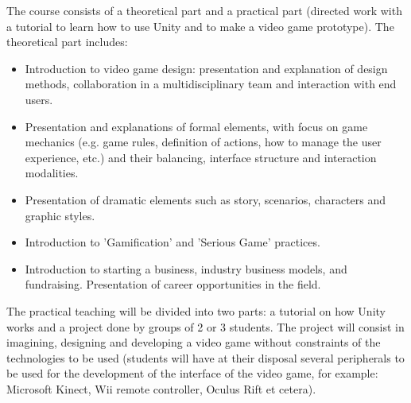 The course consists of a theoretical part and a practical part (directed work with a tutorial to learn how to use Unity and to make a video game prototype). The theoretical part includes:
\begin{itemize}
    \item Introduction to video game design: presentation and explanation of design methods, collaboration in a multidisciplinary team and interaction with end users.
    \item Presentation and explanations of formal elements, with focus on game mechanics (e.g. game rules, definition of actions, how to manage the user experience, etc.) and their balancing, interface structure and interaction modalities.
    \item Presentation of dramatic elements such as story, scenarios, characters and graphic styles.
    \item Introduction to 'Gamification' and 'Serious Game' practices.
    \item Introduction to starting a business, industry business models, and fundraising. Presentation of career opportunities in the field.
\end{itemize}
The practical teaching will be divided into two parts: a tutorial on how Unity works and a project done by groups of 2 or 3 students. The project will consist in imagining, designing and developing a video game without constraints of the technologies to be used (students will have at their disposal several peripherals to be used for the development of the interface of the video game, for example: Microsoft Kinect, Wii remote controller, Oculus Rift et cetera).